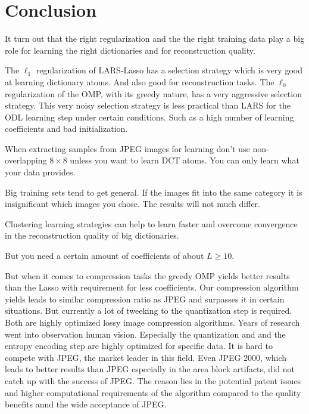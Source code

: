 \chapter{Conclusion}
It turn out that the right regularization and the the right training data
play  a big role for learning the right dictionaries and for reconstruction
quality. 

The $\ell_1$ regularization of LARS-Lasso has a selection strategy
which is very good at learning dictionary atoms. And also good for
reconstruction tasks.  The $\ell_0$ regularization of the OMP, with its greedy
nature, has a very aggressive selection strategy.  This very noisy selection
strategy is less practical than LARS for the ODL learning step under certain
conditions. Such as a high number of learning coefficients and bad
initialization.



When extracting samples from JPEG images for
learning don't use non-overlapping $8 \times 8$ unless you want to learn DCT
atoms. You can only learn what your data provides.

Big training sets tend to get general. If the images fit into the same category
it is insignificant which images you chose. The results will not much differ.

Clustering learning strategies can help to learn faster and overcome
convergence in the reconstruction quality of big dictionaries.


But you need a certain amount of coefficients of about $L \ge 10$.

But when it comes to compression tasks the greedy OMP yields better results
than the Lasso with requirement for less coefficients. 
Our compression algorithm yields leads to similar compression ratio as JPEG
and surpasses it in certain situations. But currently a lot of tweeking to the
quantization step is required. Both are highly optimized lossy image
compression algorithms. Years of research went into observation human vision. 
Especially the quantization and and the entropy encoding step are highly
optimized for specific data. It is hard to compete with JPEG, the market leader
in this field.  Even JPEG 2000, which leads to better results than JPEG
especially in the area block artifacts, did not catch up with the success of
JPEG.  The reason lies in the potential patent issues and higher computational
requirements of the algorithm compared to the quality benefits annd the wide
acceptance of JPEG.

